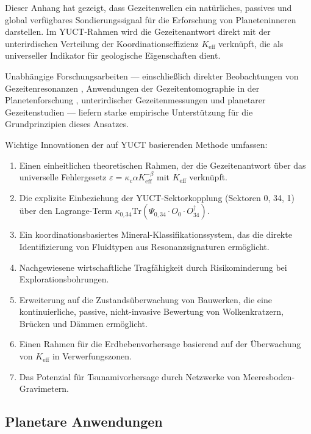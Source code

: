 \documentclass[12pt,a4paper]{article}
\theoremstyle{remark}
\newcommand{\Keff}{K_{\mathrm{eff}}}
\newcommand{\kappac}{\kappa_c}
\newcommand{\eps}{\varepsilon}
\begin{document}
	Dieser Anhang hat gezeigt, dass Gezeitenwellen ein natürliches, passives und global verfügbares Sondierungssignal für die Erforschung von Planeteninneren darstellen. Im YUCT-Rahmen wird die Gezeitenantwort direkt mit der unterirdischen Verteilung der Koordinationseffizienz $\Keff$ verknüpft, die als universeller Indikator für geologische Eigenschaften dient.
	
	Unabhängige Forschungsarbeiten — einschließlich direkter Beobachtungen von Gezeitenresonanzen \cite{Sibgatulin2014}, Anwendungen der Gezeitentomographie in der Planetenforschung \cite{RoviraNavarro2025}, unterirdischer Gezeitenmessungen \cite{Rogister2024} und planetarer Gezeitenstudien \cite{Briaud2025} — liefern starke empirische Unterstützung für die Grundprinzipien dieses Ansatzes.
	
	Wichtige Innovationen der auf YUCT basierenden Methode umfassen:
	
	\begin{enumerate}
		\item Einen einheitlichen theoretischen Rahmen, der die Gezeitenantwort über das universelle Fehlergesetz $\eps = \kappac \alpha \Keff^{-\beta}$ mit $\Keff$ verknüpft.
		\item Die explizite Einbeziehung der YUCT-Sektorkopplung (Sektoren 0, 34, 1) über den Lagrange-Term $\kappa_{0,34} \mathrm{Tr}(\Psi_{0,34} \cdot O_0 \cdot O_{34}^\dagger)$.
		\item Ein koordinationsbasiertes Mineral-Klassifikationssystem, das die direkte Identifizierung von Fluidtypen aus Resonanzsignaturen ermöglicht.
		\item Nachgewiesene wirtschaftliche Tragfähigkeit durch Risikominderung bei Explorationsbohrungen.
		\item Erweiterung auf die Zustandsüberwachung von Bauwerken, die eine kontinuierliche, passive, nicht-invasive Bewertung von Wolkenkratzern, Brücken und Dämmen ermöglicht.
		\item Einen Rahmen für die Erdbebenvorhersage basierend auf der Überwachung von \(K_{\mathrm{eff}}\) in Verwerfungszonen.
		\item Das Potenzial für Tsunamivorhersage durch Netzwerke von Meeresboden-Gravimetern.
	\end{enumerate}
	
	\subsection{Planetare Anwendungen}
	
\end{document}
